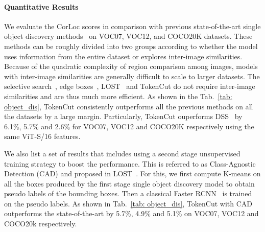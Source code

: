 \documentclass[twocolumn]{article}
\newcommand{\name} {TokenCut}
\newcommand{\CUT}[1]{}
\begin{document}
\paragraph*{Quantitative Results}
We evaluate the CorLoc scores in comparison with previous state-of-the-art single object discovery methods~\cite{uijlings2013selective, zitnick2014edge, simeoni2021localizing, kim2009unsupervised, zhang2020object, wei2019unsupervised, vo2020toward, vo2021large} on VOC07, VOC12, and COCO20K datasets. These methods can be roughly divided into two groups \CUT{based on} according to whether the model uses information from the entire dataset or explores inter-image similarities. Because of the quadratic complexity of region comparison among images, models with inter-image similarities are generally difficult to scale to larger datasets. The selective search~\cite{uijlings2013selective}, edge boxes~\cite{zitnick2014edge}, LOST~\cite{simeoni2021localizing} and {\name} do not require inter-image similarities and are thus much more efficient. As shown in the Tab.~\ref{tab: object_dis},  {\name} consistently outperforms all the previous methods on all the datasets by a large margin. 
Particularly, {\name} ouperforms DSS~\cite{melaskyriazi2022deep} by 6.1\%, 5.7\% and 2.6\% for VOC07, VOC12 and COCO20K respectively using the same ViT-S/16 features.

We also list a set of results that includes using a second stage unsupervised training strategy to boost the performance. This is referred to as Class-Agnostic Detection (CAD) and proposed in LOST~\cite{simeoni2021localizing}. For this, we first compute K-means on all the boxes produced by the first stage single object discovery model to obtain pseudo labels of the bounding boxes. Then a classical Faster RCNN~\cite{ren2015faster} is trained on the pseudo labels. As shown in Tab.~\ref{tab: object_dis}, {\name} with CAD outperforms the state-of-the-art by 5.7\%, 4.9\% and 5.1\% on VOC07, VOC12 and COCO20k respectively.
\end{document}
